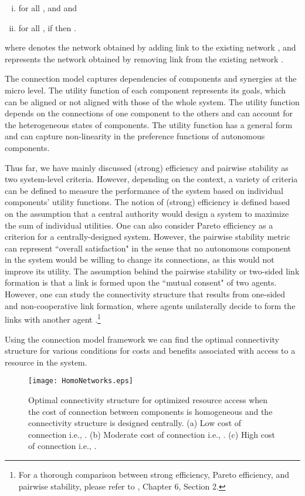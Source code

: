 \documentclass[journal,onecolumn]{IEEEtran}
\theoremstyle{plain}
\begin{document}
\begin{enumerate}[(i)]
\item for all ,  and  and
\item for all , if  then .
\end{enumerate}

where  denotes the network obtained by adding link  to the existing network , and  represents the network obtained by removing link  from the existing network .



The connection model captures dependencies of components and synergies at the micro level. The utility function of each component represents its goals, which can be aligned or not aligned with those of the whole system. The utility function depends on the connections of one component to the others and can account for the heterogeneous states of components. The utility function has a general form and can capture non-linearity in the preference functions of autonomous components. 

Thus far, we have mainly discussed (strong) efficiency and pairwise stability as two system-level criteria. However, depending on the context, a variety of criteria can be defined to measure the performance of the system based on individual components' utility functions. The notion of (strong) efficiency is defined based on the assumption that a central authority would design a system to maximize the sum of individual utilities. One can also consider Pareto efficiency as a criterion for a centrally-designed system. However, the pairwise stability metric can represent ``overall satisfaction" in the sense that no autonomous component in the system would be willing to change its connections, as this would not improve its utility. The assumption behind the pairwise stability or two-sided link formation is that a link is formed upon the ``mutual consent" of two agents. However, one can study the connectivity structure that results from one-sided and non-cooperative link formation, where agents unilaterally decide to form the links with another agent \citep{bala2000noncooperative}.\footnote{For a thorough comparison between strong efficiency, Pareto efficiency, and pairwise stability, please refer to \cite{jackson2008social}, Chapter 6, Section 2.}


Using the connection model framework we can find the optimal connectivity structure for various conditions for costs and benefits associated with access to a resource in the system.

\begin{figure}[!t]
\centering
\texttt{[image: HomoNetworks.eps]}
\caption{Optimal connectivity structure for optimized resource access when the cost of connection between components is homogeneous and the connectivity structure is designed centrally. (a) Low cost of connection i.e., . (b) Moderate cost of connection i.e., . (c) High cost of connection i.e., .}
\label{HomoNetwork}
\end{figure}
\end{document}
